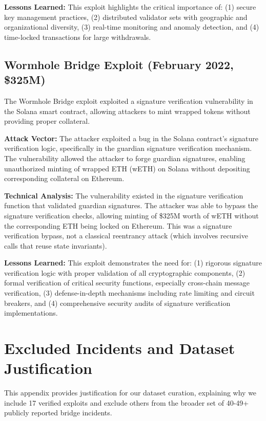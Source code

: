 \documentclass[runningheads]{llncs}
\begin{document}
\textbf{Lessons Learned:} This exploit highlights the critical importance of: (1) secure key management practices, (2) distributed validator sets with geographic and organizational diversity, (3) real-time monitoring and anomaly detection, and (4) time-locked transactions for large withdrawals.

\subsection{Wormhole Bridge Exploit (February 2022, \$325M)}
The Wormhole Bridge exploit exploited a signature verification vulnerability in the Solana smart contract, allowing attackers to mint wrapped tokens without providing proper collateral.

\textbf{Attack Vector:} The attacker exploited a bug in the Solana contract's signature verification logic, specifically in the guardian signature verification mechanism. The vulnerability allowed the attacker to forge guardian signatures, enabling unauthorized minting of wrapped ETH (wETH) on Solana without depositing corresponding collateral on Ethereum.

\textbf{Technical Analysis:} The vulnerability existed in the signature verification function that validated guardian signatures. The attacker was able to bypass the signature verification checks, allowing minting of \$325M worth of wETH without the corresponding ETH being locked on Ethereum. This was a signature verification bypass, not a classical reentrancy attack (which involves recursive calls that reuse state invariants).

\textbf{Lessons Learned:} This exploit demonstrates the need for: (1) rigorous signature verification logic with proper validation of all cryptographic components, (2) formal verification of critical security functions, especially cross-chain message verification, (3) defense-in-depth mechanisms including rate limiting and circuit breakers, and (4) comprehensive security audits of signature verification implementations.

\section{Excluded Incidents and Dataset Justification}
\label{app:excluded_incidents}

This appendix provides justification for our dataset curation, explaining why we include 17 verified exploits and exclude others from the broader set of 40-49+ publicly reported bridge incidents.
\end{document}
